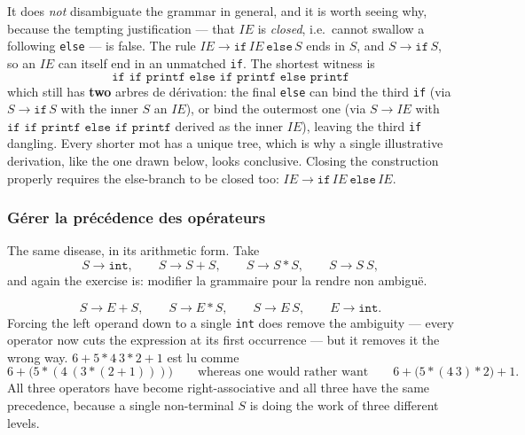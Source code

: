 \begin{remark}
  It does \emph{not} disambiguate the grammar in general, and it is worth seeing
  why, because the tempting justification --- that $IE$ is \emph{closed}, i.e.\
  cannot swallow a following \verb|else| --- is false. The rule
  $IE \to \texttt{if}\, IE\ \texttt{else}\, S$ ends in $S$, and $S \to
  \texttt{if}\, S$, so an $IE$ can itself end in an unmatched \verb|if|. The
  shortest witness is
  \[ \texttt{if if printf else if printf else printf} \]
  which still has \textbf{two} arbres de dérivation: the final \verb|else| can
  bind the third \verb|if| (via $S \to \texttt{if}\, S$ with the inner $S$ an $IE$),
  or bind the outermost one (via $S \to IE$ with
  $\texttt{if if printf else if printf}$ derived as the inner $IE$), leaving the
  third \verb|if| dangling. Every shorter mot has a unique tree, which is why
  a single illustrative derivation, like the one drawn below, looks conclusive.
  Closing the construction properly requires the else-branch to be closed too:
  $IE \to \texttt{if}\, IE\ \texttt{else}\, IE$.
\end{remark}

\begin{figure}[h!]
  \centering
\end{figure}

\subsubsection{Gérer la précédence des opérateurs}
The same disease, in its arithmetic form. Take
\[
  S \to \texttt{int}, \qquad S \to S+S, \qquad S \to S*S, \qquad S \to S \hat{\ } S ,
\]
and again the exercise is: modifier la grammaire pour la rendre non ambiguë.

\begin{example}
  \[
    S \to E+S, \qquad S \to E*S, \qquad S \to E \hat{\ } S, \qquad E \to \texttt{int} .
  \]
  Forcing the left operand down to a single \verb|int| does remove the
  ambiguity --- every operator now cuts the expression at its first occurrence
  --- but it removes it the wrong way.
  $6 + 5 * 4 \hat{\ } 3 * 2 + 1$ est lu comme
  \[
    6 + \bigl(5 * (4 \hat{\ } (3 * (2 + 1)))\bigr)
    \qquad\text{whereas one would rather want}\qquad
    6 + \bigl(5 * (4 \hat{\ } 3) * 2\bigr) + 1 .
  \]
  All three operators have become right-associative and all three have the same
  precedence, because a single non-terminal $S$ is doing the work of three
  different levels.
\end{example}

